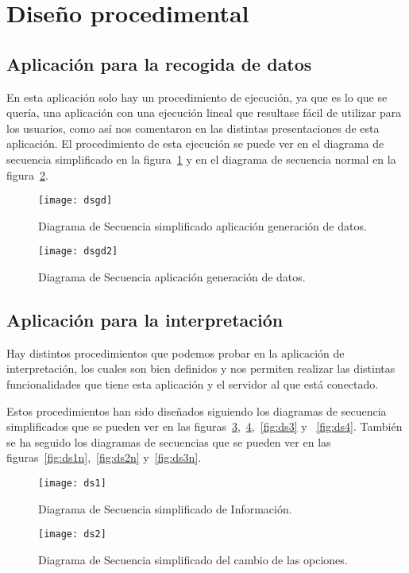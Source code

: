 \section{Diseño procedimental}
\subsection{Aplicación para la recogida de datos}
En esta aplicación solo hay un procedimiento de ejecución, ya que es lo que se quería, una aplicación con una ejecución lineal que resultase fácil de utilizar para los usuarios, como así nos comentaron en las distintas presentaciones de esta aplicación. El procedimiento de esta ejecución se puede ver en el diagrama de secuencia simplificado en la figura~\ref{fig:dsgd} y en el diagrama de secuencia normal en la figura~\ref{fig:dsgd2}.

\begin{figure}[H]
	\centering
	\texttt{[image: dsgd]}
	\caption{Diagrama de Secuencia simplificado aplicación generación de datos.}
	\label{fig:dsgd}
\end{figure}

\begin{figure}[H]
	\centering
	\texttt{[image: dsgd2]}
	\caption{Diagrama de Secuencia aplicación generación de datos.}
	\label{fig:dsgd2}
\end{figure}

\subsection{Aplicación para la interpretación}
Hay distintos procedimientos que podemos probar en la aplicación de interpretación, los cuales son bien definidos y nos permiten realizar las distintas funcionalidades que tiene esta aplicación y el servidor al que está conectado.

Estos procedimientos han sido diseñados siguiendo los diagramas de secuencia simplificados que se pueden ver en las figuras~\ref{fig:ds1},~\ref{fig:ds2},~\ref{fig:ds3} y ~\ref{fig:ds4}. También se ha seguido los diagramas de secuencias que se pueden ver en las figuras~\ref{fig:ds1n},~\ref{fig:ds2n} y~\ref{fig:ds3n}.

\begin{figure}
	\centering
	\texttt{[image: ds1]}
	\caption{Diagrama de Secuencia simplificado de Información.}
	\label{fig:ds1}
\end{figure}

\begin{figure}
	\centering
	\texttt{[image: ds2]}
	\caption{Diagrama de Secuencia simplificado del cambio de las opciones.}
	\label{fig:ds2}
\end{figure}

